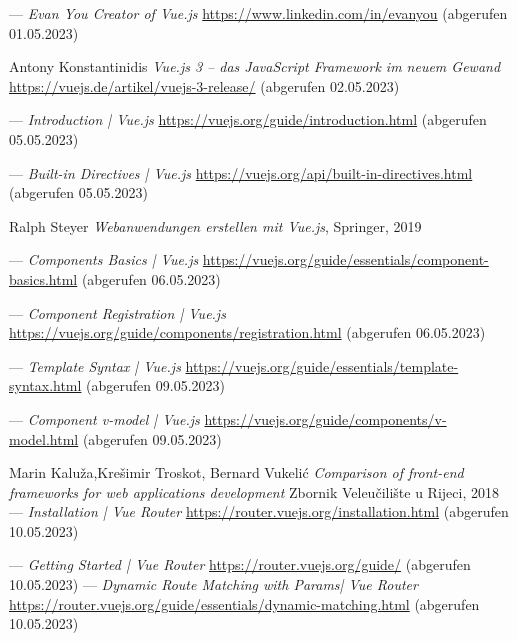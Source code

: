 \begin{thebibliography}{99}
	---
	\emph{Evan You Creator of Vue.js}
	\url{https://www.linkedin.com/in/evanyou}
	(abgerufen 01.05.2023)

	Antony Konstantinidis
	\emph{Vue.js 3 – das JavaScript Framework im neuem Gewand}
	\url{https://vuejs.de/artikel/vuejs-3-release/}
	(abgerufen 02.05.2023)

	---
	\emph{Introduction | Vue.js}
	\url{https://vuejs.org/guide/introduction.html}
	(abgerufen 05.05.2023)

	---
	\emph{Built-in Directives | Vue.js}
	\url{https://vuejs.org/api/built-in-directives.html}
	(abgerufen 05.05.2023)

	Ralph Steyer
	\emph{Webanwendungen erstellen mit Vue.js},
	Springer,
	2019

	---
	\emph{Components Basics | Vue.js}
	\url{https://vuejs.org/guide/essentials/component-basics.html}
	(abgerufen 06.05.2023)

	---
	\emph{Component Registration | Vue.js}
	\url{https://vuejs.org/guide/components/registration.html}
	(abgerufen 06.05.2023)

	---
	\emph{Template Syntax | Vue.js}
	\url{https://vuejs.org/guide/essentials/template-syntax.html}
	(abgerufen 09.05.2023)

	---
	\emph{Component v-model | Vue.js}
	\url{https://vuejs.org/guide/components/v-model.html}
	(abgerufen 09.05.2023)

	Marin Kalu{\v{z}}a,Kre{\v{s}}imir Troskot, Bernard Vukeli{\'c}
	\emph{Comparison of front-end frameworks for web applications development}
	Zbornik Veleu{\v{c}}ili{\v{s}}te u Rijeci,
	2018
	---
	\emph{Installation | Vue Router}
	\url{https://router.vuejs.org/installation.html}
	(abgerufen 10.05.2023)

	---
	\emph{Getting Started | Vue Router}
	\url{https://router.vuejs.org/guide/}
	(abgerufen 10.05.2023)
	---
	\emph{Dynamic Route Matching with Params| Vue Router}
	\url{https://router.vuejs.org/guide/essentials/dynamic-matching.html}
	(abgerufen 10.05.2023)


\end{thebibliography}
